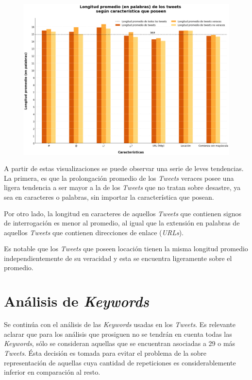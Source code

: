 \documentclass[titlepage,a4paper]{article}
\begin{document}
    \begin{figure}[H]
    \centering
    \includegraphics[width=.9\textwidth]{graficos/Analisis Lexico Grafico/long_prom_words_tweets_segun_caracteristicas.png}
    \caption{} 
    \end{figure}
    
    A partir de estas visualizaciones se puede observar una serie de leves tendencias. La primera, es que la prolongación promedio de los \textit{Tweets} veraces posee una ligera tendencia a ser mayor a la de los \textit{Tweets} que no tratan sobre desastre, ya sea en caracteres o palabras, sin importar la característica que posean.
    
    Por otro lado, la longitud en caracteres de aquellos \textit{Tweets} que contienen signos de interrogación es menor al promedio, al igual que la extensión en palabras de aquellos \textit{Tweets} que contienen direcciones de enlace (\textit{URLs}). 
    
    Es notable que los \textit{Tweets} que poseen locación tienen la misma longitud promedio independientemente de su veracidad y esta se encuentra ligeramente sobre el promedio.  
    
    \newpage
    \section{Análisis de \textit{Keywords}}\label{sec:intro}

    Se continúa con el análisis de las \textit{Keywords} usadas en los \textit{Tweets}. Es relevante aclarar que para los análisis que prosiguen no se tendrán en cuenta todas las \textit{Keywords}, sólo se consideran aquellas que se encuentran asociadas a 29 o más \textit{Tweets}. Ésta decisión es tomada para evitar el problema de la sobre representación de aquellas cuya cantidad de repeticiones es considerablemente inferior en comparación al resto. 
    
\end{document}
